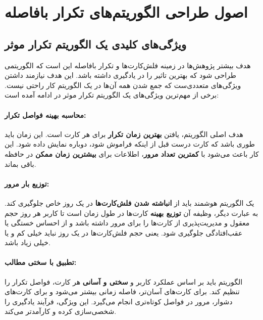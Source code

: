\documentclass[12pt]{report}
\begin{document}
\chapter{اصول طراحی الگوریتم‌های تکرار بافاصله}

\section{ویژگی‌های کلیدی یک الگوریتم تکرار موثر}

هدف بیشتر پژوهش‌ها در زمینه فلش‌کارت‌ها و تکرار بافاصله این است که
الگوریتمی طراحی  شود که بهترین تاثیر را در یادگیری داشته باشد.
این هدف نیازمند داشتن ویژگی‌های متعددی‌ست که جمع شدن همه آن‌ها در یک الگوریتم کار راحتی نیست.
برخی از مهم‌ترین ویژگی‌های یک الگوریتم تکرار موثر در ادامه آمده است:

\subsubsection{محاسبه بهینه فواصل تکرار:} هدف اصلی الگوریتم، یافتن \textbf{بهترین زمان تکرار} برای هر کارت است. این زمان باید طوری باشد که کارت درست قبل از اینکه فراموش شود، دوباره نمایش داده شود. این کار باعث می‌شود با \textbf{کمترین تعداد مرور}، اطلاعات برای \textbf{بیشترین زمان ممکن} در حافظه باقی بماند.

\subsubsection{توزیع بار مرور:} یک الگوریتم هوشمند باید از \textbf{انباشته شدن فلش‌کارت‌ها} در یک روز خاص جلوگیری کند. به عبارت دیگر، وظیفه آن \textbf{توزیع بهینه} کارت‌ها در طول زمان است تا کاربر هر روز حجم معقول و مدیریت‌پذیری از کارت‌ها را برای مرور داشته باشد و از احساس خستگی یا عقب‌افتادگی جلوگیری شود. یعنی حجم فلش‌کارت‌ها در یک روز نباید خیلی کم و یا خیلی زیاد باشد.

\subsubsection{تطبیق با سختی مطالب:} الگوریتم باید بر اساس عملکرد کاربر و \textbf{سختی و آسانی} هر کارت، فواصل تکرار را تنظیم کند. برای کارت‌های آسان‌تر، فاصله زمانی بیشتر می‌شود و برای کارت‌های دشوار، مرور در فواصل کوتاه‌تری انجام می‌گیرد. این ویژگی، فرآیند یادگیری را شخصی‌سازی کرده و کارآمدتر می‌کند.
\end{document}
